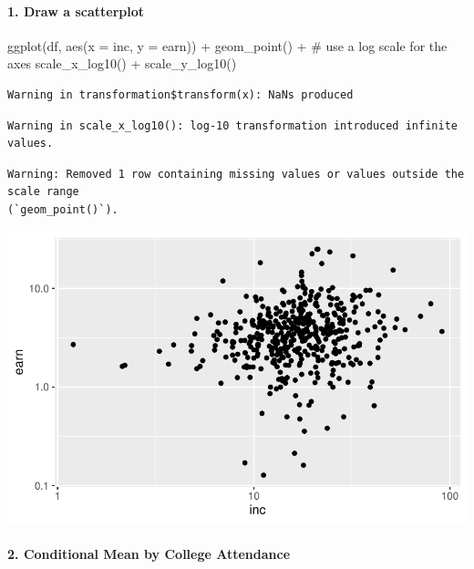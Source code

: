 \documentclass[
  letterpaper,
  DIV=11,
  numbers=noendperiod]{scrartcl}
\let\oldparagraph\paragraph
\renewcommand{\paragraph}[1]{\oldparagraph{#1}\mbox{}}
\newenvironment{Shaded}{\begin{snugshade}}{\end{snugshade}}
\newcommand{\AttributeTok}[1]{\textcolor[rgb]{0.40,0.45,0.13}{#1}}
\newcommand{\CommentTok}[1]{\textcolor[rgb]{0.37,0.37,0.37}{#1}}
\newcommand{\FunctionTok}[1]{\textcolor[rgb]{0.28,0.35,0.67}{#1}}
\newcommand{\NormalTok}[1]{\textcolor[rgb]{0.00,0.23,0.31}{#1}}
\newcommand{\SpecialCharTok}[1]{\textcolor[rgb]{0.37,0.37,0.37}{#1}}
\begin{document}
\paragraph{1. Draw a scatterplot}\label{draw-a-scatterplot}

\begin{Shaded}
\begin{Highlighting}[]
\FunctionTok{ggplot}\NormalTok{(df, }\FunctionTok{aes}\NormalTok{(}\AttributeTok{x =}\NormalTok{ inc, }\AttributeTok{y =}\NormalTok{ earn)) }\SpecialCharTok{+}
  \FunctionTok{geom\_point}\NormalTok{() }\SpecialCharTok{+}
  \CommentTok{\# use a log scale for the axes}
  \FunctionTok{scale\_x\_log10}\NormalTok{() }\SpecialCharTok{+}
  \FunctionTok{scale\_y\_log10}\NormalTok{()}
\end{Highlighting}
\end{Shaded}

\begin{verbatim}
Warning in transformation$transform(x): NaNs produced
\end{verbatim}

\begin{verbatim}
Warning in scale_x_log10(): log-10 transformation introduced infinite values.
\end{verbatim}

\begin{verbatim}
Warning: Removed 1 row containing missing values or values outside the scale range
(`geom_point()`).
\end{verbatim}

\includegraphics{Ch4.Describing-Variables_files/figure-pdf/unnamed-chunk-2-1.pdf}

\paragraph{2. Conditional Mean by College
Attendance}\label{conditional-mean-by-college-attendance}
\end{document}
